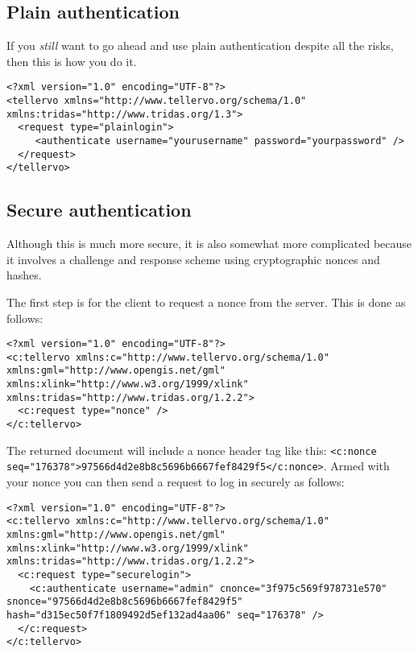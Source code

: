 \subsection{Plain authentication}
If you \emph{still} want to go ahead and use plain authentication despite all the risks, then this is how you do it.

\begin{lstlisting}
<?xml version="1.0" encoding="UTF-8"?>
<tellervo xmlns="http://www.tellervo.org/schema/1.0" xmlns:tridas="http://www.tridas.org/1.3">
  <request type="plainlogin">
     <authenticate username="yourusername" password="yourpassword" />
  </request>
</tellervo>
\end{lstlisting}

\subsection{Secure authentication}
Although this is much more secure, it is also somewhat more complicated because it involves a challenge and response scheme using cryptographic nonces and hashes.  

The first step is for the client to request a nonce from the server.  This is done as follows:

\begin{lstlisting}
<?xml version="1.0" encoding="UTF-8"?>
<c:tellervo xmlns:c="http://www.tellervo.org/schema/1.0" xmlns:gml="http://www.opengis.net/gml" xmlns:xlink="http://www.w3.org/1999/xlink" xmlns:tridas="http://www.tridas.org/1.2.2">
  <c:request type="nonce" />
</c:tellervo>
\end{lstlisting}

The returned document will include a nonce header tag like this: \lstinline$<c:nonce seq="176378">97566d4d2e8b8c5696b6667fef8429f5</c:nonce>$.  Armed with your nonce you can then send a request to log in securely as follows:

\begin{lstlisting}
<?xml version="1.0" encoding="UTF-8"?>
<c:tellervo xmlns:c="http://www.tellervo.org/schema/1.0" xmlns:gml="http://www.opengis.net/gml" xmlns:xlink="http://www.w3.org/1999/xlink" xmlns:tridas="http://www.tridas.org/1.2.2">
  <c:request type="securelogin">
    <c:authenticate username="admin" cnonce="3f975c569f978731e570" snonce="97566d4d2e8b8c5696b6667fef8429f5" hash="d315ec50f7f1809492d5ef132ad4aa06" seq="176378" />
  </c:request>
</c:tellervo>
\end{lstlisting}

